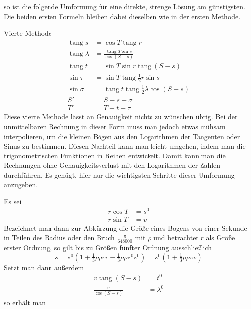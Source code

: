 %
so ist die folgende Umformung für eine direkte, strenge Lösung am günstigsten. Die beiden ersten Formeln bleiben dabei dieselben wie in der ersten Methode.

Vierte Methode
\[
\begin{aligned}
\operatorname{tang}s&=\cos T\operatorname{tang}r\\
\operatorname{tang}\lambda&=\frac{\operatorname{tang}T\sin s}{\cos(S-s)}\\
\operatorname{tang}t&=\sin T\sin r\operatorname{tang}(S-s)\\
\sin\tau&=\sin T\operatorname{tang}\tfrac{1}{2}r\sin s\\
\sin\sigma&=\operatorname{tang}t\operatorname{tang}\tfrac{1}{2}\lambda\cos(S-s)\\
S'&=S-s-\sigma\\
T'&=T-t-\tau
\end{aligned}
\]
\indent Diese vierte Methode lässt an Genauigkeit nichts zu wünschen übrig. Bei der unmittelbaren Rechnung in dieser Form muss man jedoch etwas mühsam interpolieren, um die kleinen Bögen aus den Logarithmen der Tangenten oder Sinus zu bestimmen. Diesen Nachteil kann man leicht umgehen, indem man die trigonometrischen Funktionen in Reihen entwickelt. Damit kann man die Rechnungen ohne Genauigkeitsverlust mit den Logarithmen der Zahlen durchführen. Es genügt, hier nur die wichtigsten Schritte dieser Umformung anzugeben.

Es sei
\[
\begin{aligned}
r\cos T&=s^0\\
r\sin T&=v
\end{aligned}
\]
Bezeichnet man dann zur Abkürzung die Größe eines Bogens von einer Sekunde in Teilen des Radius oder den Bruch \(\tfrac{\pi}{648000}\) mit \(\rho\) und betrachtet \(r\) als Größe erster Ordnung, so gilt bis zu Größen fünfter Ordnung ausschließlich
\[
s=s^0(1+\tfrac{1}{3}\rho\rho rr-\tfrac{1}{3}\rho\rho s^0s^0)=s^0(1+\tfrac{1}{3}\rho\rho vv)
\]
Setzt man dann außerdem
\[
\begin{aligned}
v\operatorname{tang}(S-s)&=t^0\\
\frac{v}{\cos(S-s)}&=\lambda^0
\end{aligned}
\]
so erhält man
